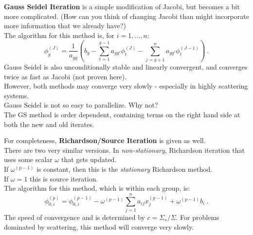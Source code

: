 \documentclass[12pt]{article}
\newcommand{\ve}[1]{\ensuremath{\mathbf{#1}}}
\begin{document}
\textbf{Gauss Seidel Iteration} is a simple modification of Jacobi, but becomes a bit more complicated. (How can you think of changing Jacobi than might incorporate more information that we already have?)\\
The algorithm for this method is, for $i = 1, \dots, n$:
\[ \phi^{(J)}_g = \frac{1}{a_{gg}}(b_g - \sum_{t=1}^{g-1} a_{gg'} \phi_t^{(J)} - \sum_{j=g+1}^{n} a_{gg'} \phi_t^{(J-1)}) \:.\]
%
Gauss Seidel is also unconditionally stable and linearly convergent, and 
converges twice as fast as Jacobi (not proven here). \\
However, both methods may converge very slowly - especially in highly scattering systems.%
%
%
%
\\
Gauss Seidel is not so easy to parallelize. Why not? \\The GS method is order dependent, containing terms on the right hand side at both the new and old iterates.

For completeness, \textbf{Richardson/Source Iteration} is given as well.\\ There are two very similar versions. In \textit{non-stationary}, Richardson iteration that uses some scalar $\omega$ that gets updated.\\
If $\omega^{(p-1)}$ is constant, then this is the \textit{stationary} Richardson method. \\ 
If $\omega = 1$ this is source iteration.\\
%
The algorithm for this method, which is within each group, is:
\[\phi_{0,i}^{(p)} =  \phi^{(p-1)}_{0,i} - \omega^{(p-1)} \sum_{j=1}^{n} a_{ij}x_j^{(p-1)} + \omega^{(p-1)} b_i \:.\]
%
The speed of convergence and is determined by $c = \Sigma_s / \Sigma$. For problems dominated by scattering, this method will converge very slowly. 
\end{document}
